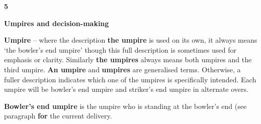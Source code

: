 \documentclass[12pt]{article}
\begin{document}
\vspace{\baselineskip}
{\fontsize{16pt}{19.2pt}\selectfont \textbf{5 \tabto{0.29in} }{\fontsize{15pt}{18.0pt}\selectfont \textbf{Umpires and decision-making}\par}\par}\par


\vspace{\baselineskip}
\begin{adjustwidth}{0.4in}{0.18in}
{\fontsize{9pt}{10.8pt} \tabto{0.39in} \textbf{Umpire }–\textbf{ }where the description\textbf{ the umpire }is used on its own, it always means ‘the bowler’s end umpire’\textbf{ }though this full description is sometimes used for emphasis or clarity. Similarly \textbf{the umpires} always means both umpires and the third umpire. \textbf{An umpire} and \textbf{umpires} are generalised terms. Otherwise, a fuller description indicates which one of the umpires is specifically intended. Each umpire will be bowler’s end umpire and striker’s end umpire in alternate overs.\par}\par

\end{adjustwidth}


\vspace{\baselineskip}

\vspace{\baselineskip}

\vspace{\baselineskip}

\vspace{\baselineskip}

\vspace{\baselineskip}
\begin{Center}
{\fontsize{8pt}{9.6pt}\par}
\end{Center}\par


\vspace{\baselineskip}

\vspace{\baselineskip}
\begin{adjustwidth}{0.4in}{0.19in}
{\fontsize{9pt}{10.8pt} \tabto{0.39in} \textbf{Bowler’s end umpire }is the umpire who is standing at the bowler’s end (see paragraph\textbf{ for }the current\textbf{ }delivery.\par}\par

\end{adjustwidth}
\end{document}
